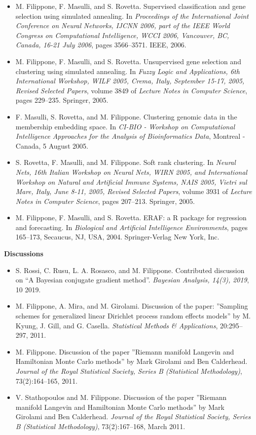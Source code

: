 \begin{itemize}
\item  M. Filippone, F. Masulli, and S. Rovetta. Supervised classification and gene selection using simulated annealing. In \emph{Proceedings of the International Joint Conference on Neural Networks, IJCNN 2006, part of the IEEE World Congress on Computational Intelligence, WCCI 2006, Vancouver, BC, Canada, 16-21 July 2006}, pages 3566--3571. IEEE, 2006.  
\item  M. Filippone, F. Masulli, and S. Rovetta. Unsupervised gene selection and clustering using simulated annealing. In \emph{Fuzzy Logic and Applications, 6th International Workshop, WILF 2005, Crema, Italy, September 15-17, 2005, Revised Selected Papers}, volume 3849 of \emph{Lecture Notes in Computer Science}, pages 229--235. Springer, 2005.  
\item  F. Masulli, S. Rovetta, and M. Filippone. Clustering genomic data in the membership embedding space. In \emph{CI-BIO - Workshop on Computational Intelligence Approaches for the Analysis of Bioinformatics Data}, Montreal - Canada, 5 August 2005.  
\item  S. Rovetta, F. Masulli, and M. Filippone. Soft rank clustering. In \emph{Neural Nets, 16th Italian Workshop on Neural Nets, WIRN 2005, and International Workshop on Natural and Artificial Immune Systems, NAIS 2005, Vietri sul Mare, Italy, June 8-11, 2005, Revised Selected Papers}, volume 3931 of \emph{Lecture Notes in Computer Science}, pages 207--213. Springer, 2005.  
\item  M. Filippone, F. Masulli, and S. Rovetta. ERAF: a R package for regression and forecasting. In \emph{Biological and Artificial Intelligence Environments}, pages 165--173, Secaucus, NJ, USA, 2004. Springer-Verlag New York, Inc.  

\end{itemize}\textbf{Discussions}\begin{itemize}\item  S. Rossi, C. Rusu, L. A. Rosasco, and M. Filippone. Contributed discussion on ``A Bayesian conjugate gradient method''. \emph{Bayesian Analysis, 14(3), 2019}, 10 2019.  
\item  M. Filippone, A. Mira, and M. Girolami. Discussion of the paper: ”Sampling schemes for generalized linear Dirichlet process random effects models” by M. Kyung, J. Gill, and G. Casella. \emph{Statistical Methods \& Applications}, 20:295--297, 2011.  
\item  M. Filippone. Discussion of the paper ”Riemann manifold Langevin and Hamiltonian Monte Carlo methods” by Mark Girolami and Ben Calderhead. \emph{Journal of the Royal Statistical Society, Series B (Statistical Methodology)}, 73(2):164--165, 2011.  
\item  V. Stathopoulos and M. Filippone. Discussion of the paper ”Riemann manifold Langevin and Hamiltonian Monte Carlo methods” by Mark Girolami and Ben Calderhead. \emph{Journal of the Royal Statistical Society, Series B (Statistical Methodology)}, 73(2):167--168, March 2011.  


\end{itemize}
